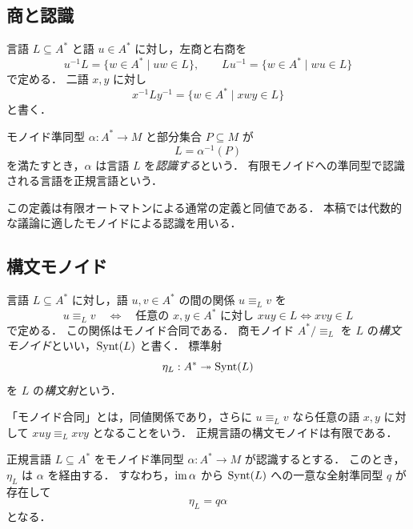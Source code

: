 \subsection{商と認識}

\begin{definition}[左商と右商]
言語 $L\subseteq A^*$ と語 $u\in A^*$ に対し，左商と右商を
\[
u^{-1}L=\{w\in A^*\mid uw\in L\},
\qquad
Lu^{-1}=\{w\in A^*\mid wu\in L\}
\]
で定める．
二語 $x,y$ に対し
\[
x^{-1}Ly^{-1}=\{w\in A^*\mid xwy\in L\}
\]
と書く．
\end{definition}

\begin{definition}[有限モノイドによる認識]
モノイド準同型 $\alpha:A^*\to M$ と部分集合 $P\subseteq M$ が
\[
L=\alpha^{-1}(P)
\]
を満たすとき，$\alpha$ は言語 $L$ を\emph{認識する}という．
有限モノイドへの準同型で認識される言語を正規言語という．
\end{definition}

この定義は有限オートマトンによる通常の定義と同値である．
本稿では代数的な議論に適したモノイドによる認識を用いる．

\subsection{構文モノイド}

\begin{definition}[構文合同と構文モノイド]
言語 $L\subseteq A^*$ に対し，語 $u,v\in A^*$ の間の関係 $u\equiv_L v$ を
\[
u\equiv_L v
\quad\Longleftrightarrow\quad
\text{任意の }x,y\in A^*\text{ に対し }xuy\in L\Longleftrightarrow xvy\in L
\]
で定める．
この関係はモノイド合同である．
商モノイド $A^*/{\equiv_L}$ を $L$ の\emph{構文モノイド}といい，$\operatorname{Synt}(L)$ と書く．
標準射
\[
\eta_L:A^*\twoheadrightarrow \operatorname{Synt}(L)
\]
を $L$ の\emph{構文射}という．
\end{definition}

「モノイド合同」とは，同値関係であり，さらに $u\equiv_L v$ なら任意の語 $x,y$ に対して $xuy\equiv_L xvy$ となることをいう．
正規言語の構文モノイドは有限である．

\begin{lemma}[認識射から構文射への因子化]\label{lem:recognition-factor}
正規言語 $L\subseteq A^*$ をモノイド準同型 $\alpha:A^*\to M$ が認識するとする．
このとき，$\eta_L$ は $\alpha$ を経由する．
すなわち，$\operatorname{im}\alpha$ から $\operatorname{Synt}(L)$ への一意な全射準同型 $q$ が存在して
\[
\eta_L=q\alpha
\]
となる．
\end{lemma}

